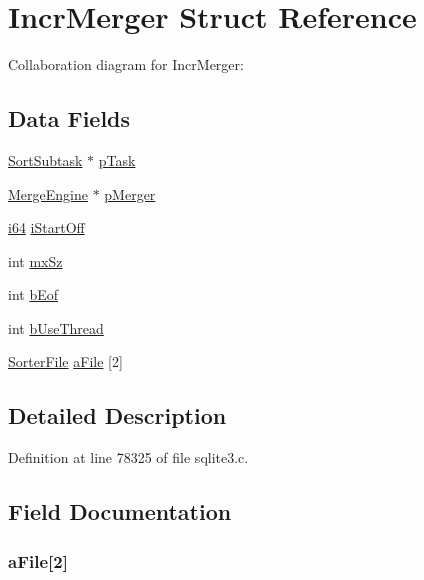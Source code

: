 \hypertarget{struct_incr_merger}{}\section{Incr\+Merger Struct Reference}
\label{struct_incr_merger}


Collaboration diagram for Incr\+Merger\+:
\subsection*{Data Fields}
\begin{DoxyCompactItemize}
\item 
\hyperlink{struct_sort_subtask}{Sort\+Subtask} $\ast$ \hyperlink{struct_incr_merger_ab1de7a866e3b281bba80ccb606ec2ae1}{p\+Task}
\item 
\hyperlink{struct_merge_engine}{Merge\+Engine} $\ast$ \hyperlink{struct_incr_merger_ab9ebb5ec47cc445078cf9ffb98b9e66f}{p\+Merger}
\item 
\hyperlink{sqlite3_8c_a2a0f0f4ae7001eb54351f77ea1cdbcfd}{i64} \hyperlink{struct_incr_merger_aeb48c246fa5d7535b40c341d02ce4bc6}{i\+Start\+Off}
\item 
int \hyperlink{struct_incr_merger_ad0f72137587b0e7ca896520d1b31c834}{mx\+Sz}
\item 
int \hyperlink{struct_incr_merger_a90d50c1a12552be88cb9a36b4458e337}{b\+Eof}
\item 
int \hyperlink{struct_incr_merger_a8668e6d8e79cecf90b00fd10deef9fd3}{b\+Use\+Thread}
\item 
\hyperlink{struct_sorter_file}{Sorter\+File} \hyperlink{struct_incr_merger_acfdbd3e6736ba1c06b5e5da4a50b4b7a}{a\+File} \mbox{[}2\mbox{]}
\end{DoxyCompactItemize}


\subsection{Detailed Description}


Definition at line 78325 of file sqlite3.\+c.



\subsection{Field Documentation}
\hypertarget{struct_incr_merger_acfdbd3e6736ba1c06b5e5da4a50b4b7a}{}
\subsubsection[{a\+File}]{ a\+File\mbox{[}2\mbox{]}}\label{struct_incr_merger_acfdbd3e6736ba1c06b5e5da4a50b4b7a}


